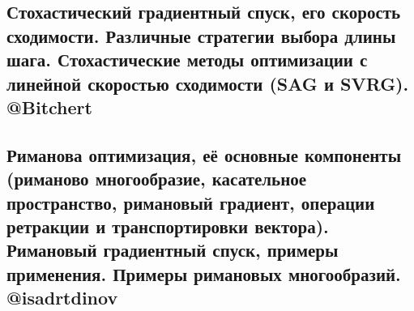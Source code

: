 \documentclass[a4paper, 16pt]{article}
\begin{document}
    

    \subsection{Стохастический градиентный спуск, его скорость сходимости. Различные стратегии выбора длины шага. Стохастические методы оптимизации с линейной скоростью сходимости (SAG и SVRG). @Bitchert}

    

    \subsection{Риманова оптимизация, её основные компоненты (риманово многообразие, касательное пространство, римановый градиент, операции ретракции и транспортировки вектора). Римановый градиентный спуск, примеры применения. Примеры римановых многообразий. @isadrtdinov}

    
\end{document}
